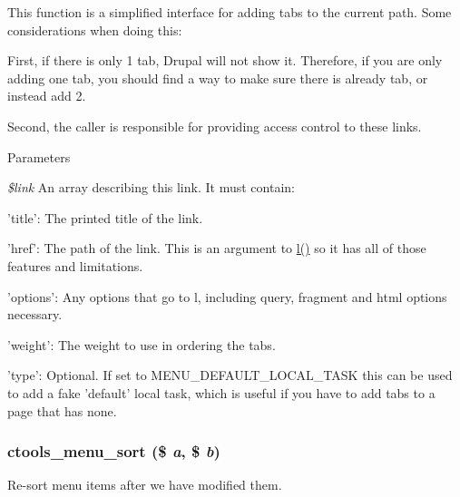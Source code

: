This function is a simplified interface for adding tabs to the current path. Some considerations when doing this:


\begin{DoxyItemize}
\item First, if there is only 1 tab, Drupal will not show it. Therefore, if you are only adding one tab, you should find a way to make sure there is already tab, or instead add 2.
\item Second, the caller is responsible for providing access control to these links.
\end{DoxyItemize}


\begin{DoxyParams}{Parameters}
\item[{\em \$link}]An array describing this link. It must contain:
\begin{DoxyItemize}
\item 'title': The printed title of the link.
\item 'href': The path of the link. This is an argument to \hyperlink{common_8inc_ad3b36c06dc46250b8d22b8d0d2e7bd97}{l()} so it has all of those features and limitations.
\item 'options': Any options that go to l, including query, fragment and html options necessary.
\item 'weight': The weight to use in ordering the tabs.
\item 'type': Optional. If set to MENU\_\-DEFAULT\_\-LOCAL\_\-TASK this can be used to add a fake 'default' local task, which is useful if you have to add tabs to a page that has none. 
\end{DoxyItemize}\end{DoxyParams}
\hypertarget{profiles_2dosomething_2modules_2contrib_2ctools_2includes_2menu_8inc_a4175eeb345ac720cbe0f27042cce1fa6}{
\subsubsection[{ctools\_\-menu\_\-sort}]{\setlength{\rightskip}{0pt plus 5cm}ctools\_\-menu\_\-sort (\$ {\em a}, \/  \$ {\em b})}}
\label{profiles_2dosomething_2modules_2contrib_2ctools_2includes_2menu_8inc_a4175eeb345ac720cbe0f27042cce1fa6}
Re-\/sort menu items after we have modified them. 